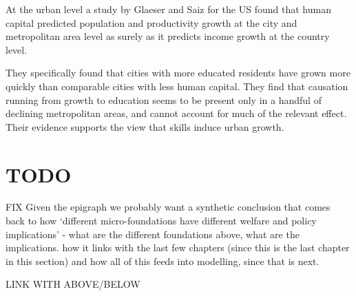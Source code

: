 At the urban level a study by Glaeser and Saiz \cite{glaeserRiseSkilledCity2003} for the US found that human capital predicted population and productivity growth at the city and metropolitan area level as surely as it predicts income growth at the country level. 

They specifically found that cities with more educated residents have grown more quickly than comparable cities with less human capital. They find that causation running from growth to education seems to be present only in a handful of declining metropolitan areas, and cannot account for much of the relevant effect. Their evidence supports the view that skills induce urban growth.


\section{TODO}
FIX
Given the epigraph we probably want a synthetic conclusion that comes back to how `different micro-foundations have different welfare and policy implications' - what are the different foundations above, what are the implications. how it links with the last few chapters (since this is the last chapter in this section) and how all of this feeds into modelling, since that is next.



LINK WITH ABOVE/BELOW










